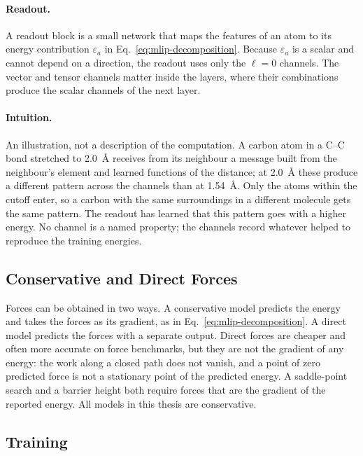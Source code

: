 \paragraph{Readout.} A readout block is a small network that maps the
features of an atom to its energy contribution $\varepsilon_a$ in
Eq.~\eqref{eq:mlip-decomposition}. Because $\varepsilon_a$ is a scalar
and cannot depend on a direction, the readout uses only the $\ell = 0$
channels. The vector and tensor channels matter inside the layers, where
their combinations produce the scalar channels of the next layer.

\paragraph{Intuition.} An illustration, not a description of the
computation. A carbon atom in a C--C bond stretched to 2.0~\AA{} receives
from its neighbour a message built from the neighbour's element and
learned functions of the distance; at 2.0~\AA{} these produce a different
pattern across the channels than at 1.54~\AA. Only the atoms within the
cutoff enter, so a carbon with the same surroundings in a different
molecule gets the same pattern. The readout has learned that this pattern
goes with a higher energy. No channel is a named property; the channels
record whatever helped to reproduce the training energies.

\subsection{Conservative and Direct Forces}
\label{sec:mlip-conservative}

Forces can be obtained in two ways. A conservative model predicts the
energy and takes the forces as its gradient, as in
Eq.~\eqref{eq:mlip-decomposition}. A direct model predicts the forces with
a separate output. Direct forces are cheaper and often more accurate on
force benchmarks, but they are not the gradient of any energy: the work
along a closed path does not vanish, and a point of zero predicted force
is not a stationary point of the predicted energy. A saddle-point search
and a barrier height both require forces that are the gradient of the
reported energy. All models in this thesis are conservative.

\subsection{Training}
\label{sec:mlip-training}

